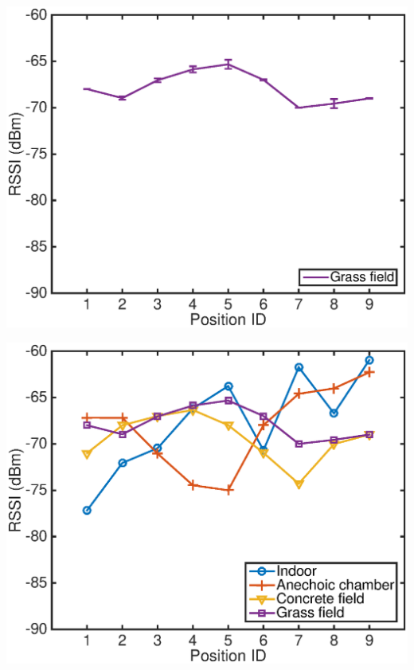 \documentclass[11pt]{beamer}
\begin{document}
\begin{frame}
\includegraphics[width=\textwidth]{deep_fading_2530_plot_grass.eps} 
\end{frame}

\begin{frame}
\includegraphics[width=\textwidth]{deep_fading_2530_plot_with_grass.eps} 
\end{frame}
\end{document}
